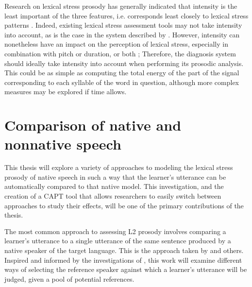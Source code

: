 		Research on lexical stress prosody has generally indicated that intensity is the least important of the three features, i.e. corresponds least closely to lexical stress patterns \citep{Cutler2005}. 
Indeed, existing lexical stress assessment tools may not take intensity into account, as is the case in the system described by \textcite{Bonneau2011}.  However, intensity can nonetheless have an impact on the perception of lexical stress, especially in combination with pitch or duration, or both \citep{Cutler2005}; %
Therefore, the diagnosis system should ideally take intensity into account when performing its prosodic analysis. This could be as simple as computing the total energy of the part of the signal corresponding to each syllable of the word in question, although more complex measures may be explored if time allows.
	
\section{Comparison of native and nonnative speech}
\label{sec:diag:compare}

	This thesis will explore a variety of approaches to modeling the lexical stress prosody of native speech in such a way that the learner's utterance can be automatically compared to that native model. This investigation, and the creation of a CAPT tool that allows researchers to easily switch between approaches to study their effects, will be one of the primary contributions of the thesis.
	
	
	The most common approach to assessing L2 prosody involves comparing a learner's utterance to a single utterance of the same sentence produced by a native speaker of the target language. This is the approach taken by \textcite{Bonneau2011} and others.
	 Inspired and informed by the investigations of \textcite{Probst2002}, this work will examine different ways of selecting the reference speaker against which a learner's utterance will be judged, given a pool of potential references. 
	
